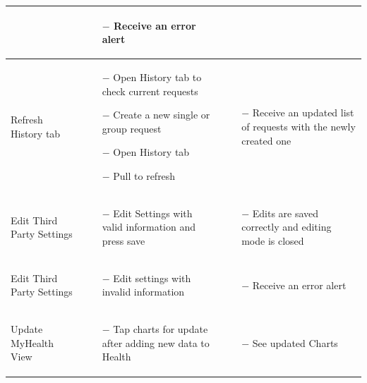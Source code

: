 \documentclass[titlepage]{article}
\begin{document}
\begin{longtable}{| p{3 cm} | p{4 cm} | p{4 cm} |}
\begin{itemize}[nolistsep]
		\end{itemize}
		& \begin{itemize}[nolistsep]
			\item[$-$] Receive an error alert
		\end{itemize} \\ \hline
		Refresh History tab & \begin{itemize}[nolistsep]
			\item[$-$] Open History tab to check current requests
			\item[$-$] Create a new single or group request
			\item[$-$] Open History tab
			\item[$-$] Pull to refresh 
		\end{itemize}
		& \begin{itemize}[nolistsep]
			\item[$-$] Receive an updated list of requests with the newly created one
		\end{itemize} \\ \hline
		Edit Third Party Settings & \begin{itemize}[nolistsep]
			\item[$-$] Edit Settings with valid information and press save
		\end{itemize}
		& \begin{itemize}[nolistsep]
			\item[$-$] Edits are saved correctly and editing mode is closed
		\end{itemize} \\ \hline
		Edit Third Party Settings & \begin{itemize}[nolistsep]
			\item[$-$] Edit settings with invalid information
		\end{itemize}
		& \begin{itemize}[nolistsep]
			\item[$-$] Receive an error alert
		\end{itemize} \\ \hline
		Update MyHealth View & \begin{itemize}[nolistsep]
			\item[$-$] Tap charts for update after adding new data to Health
		\end{itemize}
		& \begin{itemize}[nolistsep]
			\item[$-$] See updated Charts
		\end{itemize} \\ \hline

\end{longtable}
\end{document}
